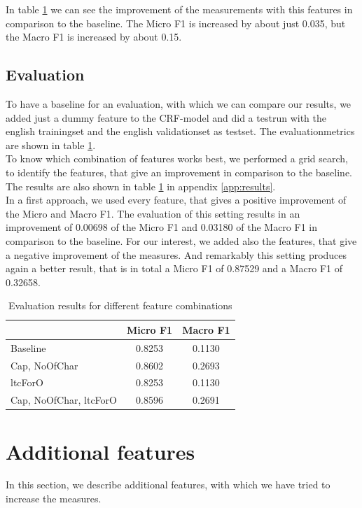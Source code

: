 \documentclass[noindent, nochapname]{tudexercise}
\begin{document}
		In table \ref{tab:results} we can see the improvement of the measurements with this features in comparison to the baseline. The Micro F1 is increased by about just 0.035, but the Macro F1 is increased by about 0.15.
		
		\subsection{Evaluation}
			To have a baseline for an evaluation, with which we can compare our results, we added just a dummy feature to the CRF-model and did a testrun with the english trainingset and the english validationset as testset. The evaluationmetrics are shown in table \ref{tab:results}.\\
			To know which combination of features works best, we performed a grid search, to identify the features, that give an improvement in comparison to the baseline. The results are also shown in table \ref{tab:results} in appendix \ref{app:results}.\\
			In a first approach, we used every feature, that gives a positive improvement of the Micro and Macro F1. The evaluation of this setting results in an improvement of 0.00698 of the Micro F1 and 0.03180 of the Macro F1 in comparison to the baseline. For our interest, we added also the features, that give a negative improvement of the measures. And remarkably this setting produces again a better result, that is in total a Micro F1 of 0.87529 and a Macro F1 of 0.32658.
			
			\begin{table}[h]
				\centering
				\caption{Evaluation results for different feature combinations}
				\label{tab:results}
				\begin{tabular}{lcc}
					\toprule
& \textbf{Micro F1} & \textbf{Macro F1}\\
					\midrule
Baseline & 0.8253 & 0.1130\\
Cap, NoOfChar & 0.8602 & 0.2693\\
ltcForO & 0.8253 & 0.1130\\
Cap, NoOfChar, ltcForO & 0.8596 & 0.2691\\
					\bottomrule
				\end{tabular}
			\end{table}
	
	\section{Additional features}
		In this section, we describe additional features, with which we have tried to increase the measures.
		
\end{document}

